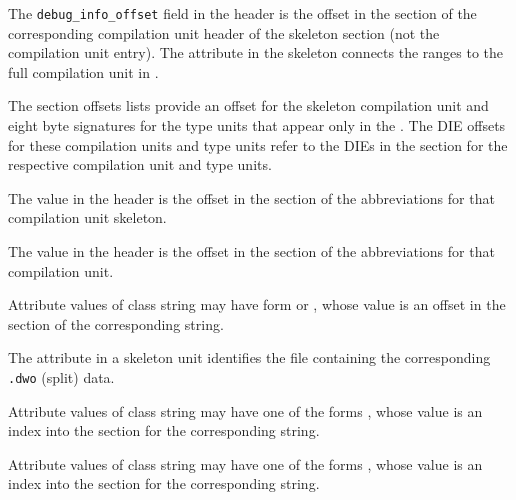 \begin{description}

The \texttt{debug\_info\_offset} field in the header is the 
offset in the \dotdebuginfo{} section of the corresponding 
compilation unit header of the skeleton \dotdebuginfo{} section 
(not the compilation unit entry).  The \DWATdwoname{} attribute 
in the \dotdebuginfo{} skeleton connects 
the ranges to the full compilation unit in \dotdebuginfodwo.

The \dotdebugnames{} section  offsets lists provide an offset
for the skeleton compilation unit and eight 
byte signatures for the type units that appear only in the 
\dotdebuginfodwo. The DIE offsets for these 
compilation units and type units refer to the DIEs in the 
\dotdebuginfodwo{} section for the respective 
compilation unit and type units.

The \HFNdebugabbrevoffset{} value in the header is 
the offset in the \dotdebugabbrev{} section of the 
abbreviations for that compilation unit skeleton.

The \HFNdebugabbrevoffset{} value in the header 
is the offset in the \dotdebugabbrevdwo{} section of the 
abbreviations for that compilation unit.

Attribute values of class string may have form \DWFORMstrp{}
\bb 
or \DWFORMstrpeight{},
\eb
whose value is an offset in the 
\dotdebugstr{} section of the corresponding string.

The \DWATdwoname{}
attribute in a skeleton unit identifies the file containing 
the corresponding \texttt{.dwo} (split) data. 

\db

Attribute values of class string may have one of the forms
\DWFORMstrxXNor, whose value is an index into the 
\dotdebugstroffsets{} section for the corresponding string.

Attribute values of class string may have one of the forms
\DWFORMstrxXNor, whose value is an index into the 
\dotdebugstroffsetsdwo{} section for the corresponding string.


\end{description}
